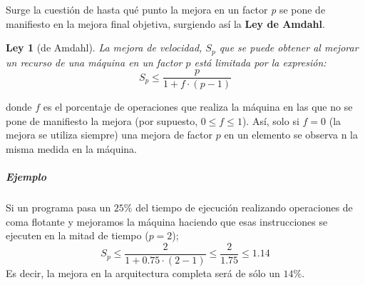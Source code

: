 \documentclass[12pt,spanish]{article}
\newtheorem{law}{Ley}
\begin{document}
Surge la cuestión de hasta qué punto la mejora en un factor \emph{p} se pone de manifiesto en la mejora final objetiva, surgiendo así la \textbf{Ley de Amdahl}.
\begin{law}[de Amdahl]
La mejora de velocidad, $S_p$ que se puede obtener al mejorar un recurso de una máquina en un factor $p$ está limitada por la expresión:
\[ S_p \leq \frac{p}{1 + f \cdot (p-1)} \]
\end{law}
donde $f$ es el porcentaje de operaciones que realiza la máquina en las que no se pone de manifiesto la mejora (por supuesto, $0 \leq f \leq 1$). Así, solo si $f=0$ (la mejora se utiliza siempre) una mejora de factor $p$ en un elemento se observa n la misma medida en la máquina.
\subparagraph{Ejemplo}
Si un programa pasa un $25\%$ del tiempo de ejecución realizando operaciones de coma flotante y mejoramos la máquina haciendo que esas instrucciones se ejecuten en la mitad de tiempo ($p=2$);
\[ S_p \leq \frac{2}{1 + 0.75 \cdot (2-1)} \leq \frac{2}{1.75} \leq 1.14\]
Es decir, la mejora en la arquitectura completa será de sólo un $14\%$.
\end{document}
